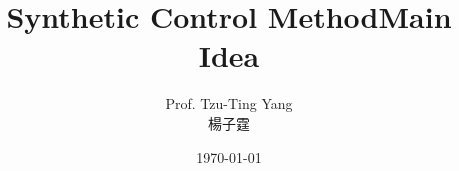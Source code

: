 \documentclass[dvipsnames,hyperref={pdfpagelabels=false}]{beamer}
\title[]  
{Synthetic Control Method}
\author 
{Prof. Tzu-Ting Yang  \\ 楊子霆}
\institute{Institute of Economics, Academia Sinica  \\ 中央研究院經濟研究所}
\date
{\today}
\begin{document}
	
	
	\begin{frame}{}
	\titlepage
\end{frame}




\title[]  
{Main Idea}


\author 
{}

\institute{}






\date
{}


\begin{frame}{}
	\titlepage
\end{frame}





%			
%			
%		
%		
\end{document}
